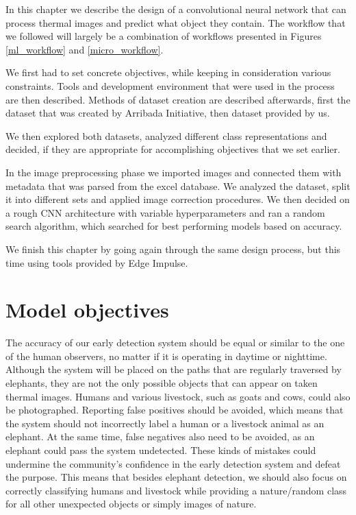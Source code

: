In this chapter we describe the design of a convolutional neural network that can process thermal images and predict what object they contain.
The workflow that we followed will largely be a combination of workflows presented in Figures \ref{ml_workflow} and \ref{micro_workflow}.

We first had to set concrete objectives, while keeping in consideration various constraints.
Tools and development environment that were used in the process are then described. 
Methods of dataset creation are described afterwards, first the dataset that was created by Arribada Initiative, then dataset provided by us. 

We then explored both datasets, analyzed different class representations and decided, if they are appropriate for accomplishing objectives that we set earlier.

In the image preprocessing phase we imported images and connected them with metadata that was parsed from the excel database.
We analyzed the dataset, split it into different sets and applied image correction procedures.
We then decided on a rough CNN architecture with variable hyperparameters and ran a random search algorithm, which searched for best performing models based on accuracy.

We finish this chapter by going again through the same design process, but this time using tools provided by Edge Impulse.


\section{ Model objectives}


The accuracy of our early detection system should be equal or similar to the one of the human observers, no matter if it is operating in daytime or nighttime.
Although the system will be placed on the paths that are regularly traversed by elephants, they are not the only possible objects that can appear on taken thermal images.
Humans and various livestock, such as goats and cows, could also be photographed.
Reporting false positives should be avoided, which means that the system should not incorrectly label a human or a livestock animal as an elephant.
At the same time, false negatives also need to be avoided, as an elephant could pass the system undetected.
These kinds of mistakes could undermine the community's confidence in the early detection system and defeat the purpose.
This means that besides elephant detection, we should also focus on correctly classifying humans and livestock while providing a nature/random class for all other unexpected objects or simply images of nature.

